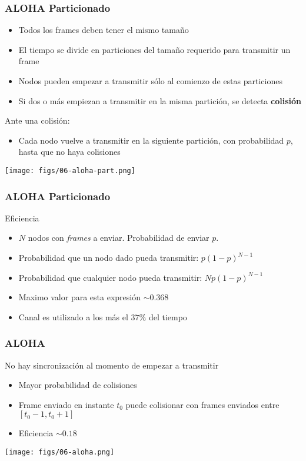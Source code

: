 \documentclass[letter]{beamer}
\begin{document}
\begin{frame}
  \frametitle{ALOHA Particionado}

  \begin{itemize}
    \item Todos los frames deben tener el mismo tamaño
    \item El tiempo se divide en particiones del tamaño requerido para transmitir un frame
    \item Nodos pueden empezar a transmitir sólo al comienzo de estas particiones
    \item Si dos o más empiezan a transmitir en la misma partición, se detecta {\bf colisión}
  \end{itemize}
  Ante una colisión:
  \begin{itemize}
    \item Cada nodo vuelve a transmitir en la siguiente partición, con probabilidad $p$, hasta que no haya colisiones
  \end{itemize}
  \begin{center}
    \texttt{[image: figs/06-aloha-part.png]}
  \end{center}

\end{frame}
\begin{frame}
  \frametitle{ALOHA Particionado}
  Eficiencia
  \begin{itemize}
    \item $N$ nodos con {\em frames} a enviar. Probabilidad de enviar $p$.
    \item Probabilidad que un nodo dado pueda transmitir: $p(1-p)^{N-1}$
    \item Probabilidad que cualquier nodo pueda transmitir: $Np(1-p)^{N-1}$
    \item Maximo valor para esta expresión $\sim 0.368$
    \item Canal es utilizado a los más el $37\%$ del tiempo
  \end{itemize}

\end{frame}
\begin{frame}
  \frametitle{ALOHA}
  No hay sincronización al momento de empezar a transmitir
  \begin{itemize}
    \item Mayor probabilidad de colisiones
    \item Frame enviado en instante $t_0$ puede colisionar con frames enviados entre $[t_0-1,t_0+1]$
    \item Eficiencia $\sim 0.18$
  \end{itemize}

  \begin{center}
    \texttt{[image: figs/06-aloha.png]}
  \end{center}

\end{frame}
\end{document}

